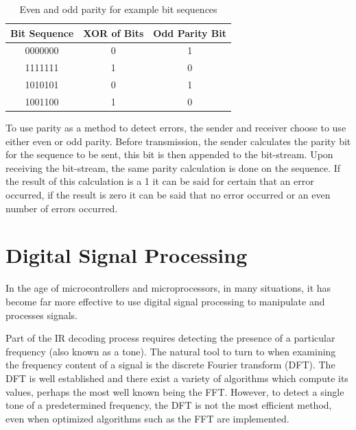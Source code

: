 \begin{table}[H]
	\centering
	\begin{tabular}{ccc}
		\hline
		\multicolumn{1}{l}{\textbf{Bit Sequence}} & \textbf{XOR of Bits} & \multicolumn{1}{l}{\textbf{Odd Parity Bit}} \\ \hline
		0000000 & 0 & 1 \\ \hline
		1111111 & 1 & 0 \\ \hline
		1010101 & 0 & 1 \\ \hline
		1001100 & 1 & 0 \\ \hline
	\end{tabular}
	\caption{Even and odd parity for example bit sequences}
	\label{tbl:party_examples}
\end{table}

To use parity as a method to detect errors, the sender and receiver choose to use either even or odd parity. Before transmission, the sender calculates the parity bit for the sequence to be sent, this bit is then appended to the bit-stream. Upon receiving the bit-stream, the same parity calculation is done on the sequence. If the result of this calculation is a 1 it can be said for certain that an error occurred, if the result is zero it can be said that no error occurred or an even number of errors occurred.






\section{Digital Signal Processing}
In the age of microcontrollers and microprocessors, in many situations, it has become far more effective to use digital signal processing to manipulate and processes signals.

Part of the IR decoding process requires detecting the presence of a particular frequency (also known as a tone). The natural tool to turn to when examining the frequency content of a signal is the discrete Fourier transform (DFT). The DFT is well established and there exist a variety of algorithms which compute its values, perhaps the most well known being the FFT. However, to detect a single tone of a predetermined frequency, the DFT is not the most efficient method, even when optimized algorithms such as the FFT are implemented.

